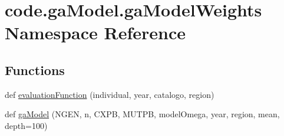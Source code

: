 \hypertarget{namespacecode_1_1ga_model_1_1ga_model_weights}{}\section{code.\+ga\+Model.\+ga\+Model\+Weights Namespace Reference}
\label{namespacecode_1_1ga_model_1_1ga_model_weights}
\subsection*{Functions}
\begin{DoxyCompactItemize}
\item 
def \hyperlink{namespacecode_1_1ga_model_1_1ga_model_weights_a391a75f316a29e0dfba1b8adda65c526}{evaluation\+Function} (individual, year, catalogo, region)
\item 
def \hyperlink{namespacecode_1_1ga_model_1_1ga_model_weights_ad5f42777ce1e884bfb1cc58fa17e432b}{ga\+Model} (N\+G\+EN, n, C\+X\+PB, M\+U\+T\+PB, model\+Omega, year, region, mean, depth=100)
\end{DoxyCompactItemize}
